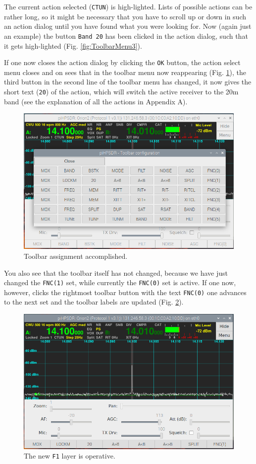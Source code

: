 \documentclass[12pt]{book}
\begin{document}
The current action selected (\texttt{CTUN}) is high-lighted. Lists of possible actions can be rather long,
so it might be necessary that you have to scroll up or down in such an action dialog until you have
found what you were looking for. Now (again just an example) the button \texttt{Band 20} has been clicked
in the action dialog, such that it gets high-lighted (Fig. \ref{fig:ToolbarMenu3}).

If one now closes the action dialog by clicking the \texttt{OK} button, the action select menu
closes and on sees that in the toolbar menu now reappearing (Fig. \ref{fig:ToolbarMenu4}), the third button
in the second
line of the toolbar menu has changed, it now gives the short text (\texttt{20}) of the action, which will
switch the active receiver to the 20m band (see the explanation of all the actions in Appendix A).

\begin{figure}[ht!]
\center
\includegraphics[width=12cm]{ToolbarMenu4.png}
\caption{Toolbar assignment accomplished.}
\label{fig:ToolbarMenu4}
\end{figure}

You also see that the toolbar itself has not changed, because we have just changed the \texttt{FNC(1)} set,
while currently the \texttt{FNC(0)} set is active. If one now, however, clicks the rightmost
toolbar button with the text \texttt{FNC(0)} one advances to the next set and the toolbar labels
are updated (Fig. \ref{fig:ToolbarMenu5}).

\begin{figure}[ht!]
\center
\includegraphics[width=12cm]{ToolbarMenu5.png}
\caption{The new \texttt{F1} layer is operative.}
\label{fig:ToolbarMenu5}
\end{figure}
\end{document}
